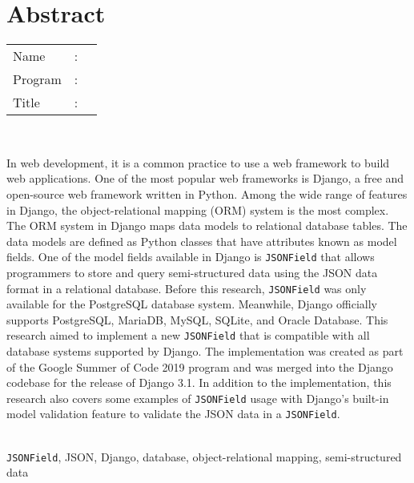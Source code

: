 %
%
%

\chapter*{Abstract}
\singlespacing

\vspace*{0.2cm}

\noindent \begin{tabular}{l l p{11.0cm}}
	Name&: & \penulis \\
	Program&: & \program \\
	Title&: & \judulInggris \\
\end{tabular} \\

\vspace*{0.5cm}

\noindent
In web development, it is a common practice to use a web framework to build web
applications. One of the most popular web frameworks is Django, a free and
open-source web framework written in Python. Among the wide range of features
in Django, the object-relational mapping (ORM) system is the most complex. The
ORM system in Django maps data models to relational database tables. The data
models are defined as Python classes that have attributes known as model
fields. One of the model fields available in Django is \verb|JSONField| that
allows programmers to store and query semi-structured data using the JSON data
format in a relational database. Before this research, \verb|JSONField| was
only available for the PostgreSQL database system. Meanwhile, Django officially
supports PostgreSQL, MariaDB, MySQL, SQLite, and Oracle Database. This research
aimed to implement a new \verb|JSONField| that is compatible with all database
systems supported by Django. The implementation was created as part of the
Google Summer of Code 2019 program and was merged into the Django codebase for
the release of Django 3.1. In addition to the implementation, this research
also covers some examples of \verb|JSONField| usage with Django's built-in
model validation feature to validate the JSON data in a \verb|JSONField|.\\

\vspace*{0.2cm}

\noindent {} \\
\verb|JSONField|, JSON, Django, database, object-relational mapping,
semi-structured data \\

\onehalfspacing
\newpage
